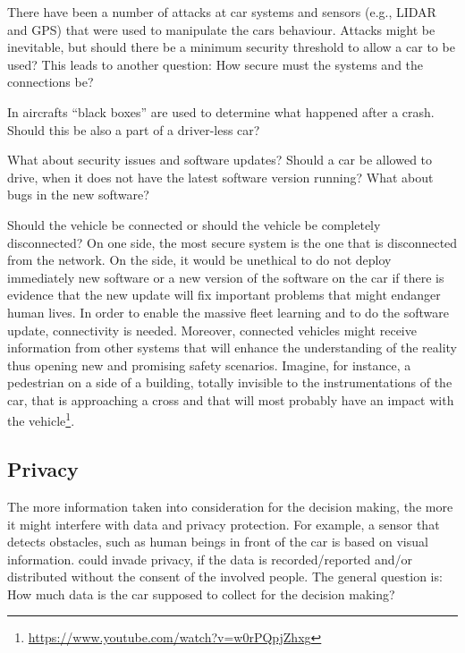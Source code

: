There have been a number of attacks at car systems and sensors (e.g., LIDAR and GPS) that were used to manipulate the cars behaviour. Attacks might be inevitable, but should there be a minimum security threshold to allow a  car to be used? This leads to another question: How secure must the systems and the connections be? 

In aircrafts \enquote{black boxes} are used to determine what happened after a crash. Should this be also a part of a driver-less car? 

What about security issues and software updates? Should a  car be allowed to drive, when it does not have the latest software version running? What about bugs in the new software?

Should the vehicle be connected or should the vehicle be completely disconnected? On one side, the most secure system is the one that is disconnected from the network. On the side, it would be unethical to do not deploy immediately new software or a new version of the software on the car if there is evidence that the new update will fix important problems that might endanger human lives. 
In order to enable the massive fleet learning and to do the software update, connectivity is needed. Moreover, connected vehicles might receive information from other systems that will enhance the understanding of the reality thus opening new and promising safety scenarios. Imagine, for instance, a pedestrian on a side of a building, totally invisible to the instrumentations of the car, that is approaching a cross and that will most probably have an impact with the vehicle\footnote{\url{https://www.youtube.com/watch?v=w0rPQpjZhxg}}. 


\subsection{Privacy}
\label{sec:EAofTC:Privacy}

The more information taken into consideration for the decision making, the more it might interfere with data and privacy protection. For example, a sensor that detects obstacles, such as human beings in front of the car is based on visual information.  could invade privacy, if the data is recorded/reported and/or distributed without the consent of the involved people. The general question is: How much data is the car supposed to collect for the decision making?  

